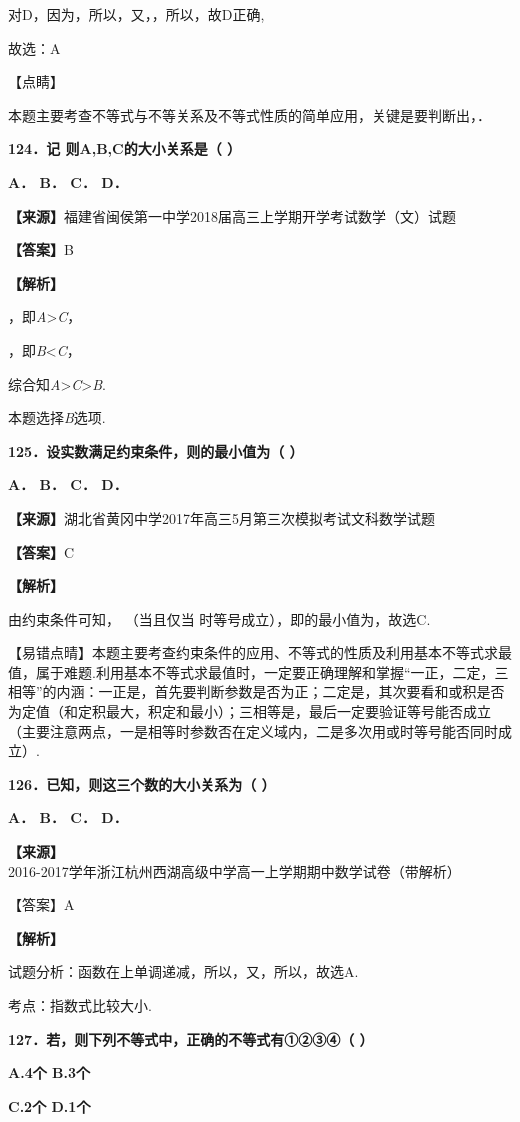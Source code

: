 对D，因为，所以，又，，所以，故D正确,

故选：A

【点睛】

本题主要考查不等式与不等关系及不等式性质的简单应用，关键是要判断出，．

\textbf{124．记 则A,B,C的大小关系是（ ）}

\textbf{A． B． C． D．}

\textbf{【来源】}福建省闽侯第一中学2018届高三上学期开学考试数学（文）试题

\textbf{【答案】}B

\textbf{【解析】}

，即\emph{A}\textgreater{}\emph{C}，

，即\emph{B}\textless{}\emph{C}，

综合知\emph{A}\textgreater{}\emph{C}\textgreater{}\emph{B}.

本题选择\emph{B}选项.

\textbf{125．设实数满足约束条件，则的最小值为（ ）}

\textbf{A． B． C． D．}

\textbf{【来源】}湖北省黄冈中学2017年高三5月第三次模拟考试文科数学试题

\textbf{【答案】}C

\textbf{【解析】}

由约束条件可知， （当且仅当 时等号成立），即的最小值为，故选C.

【易错点晴】本题主要考查约束条件的应用、不等式的性质及利用基本不等式求最值，属于难题.利用基本不等式求最值时，一定要正确理解和掌握``一正，二定，三相等''的内涵：一正是，首先要判断参数是否为正；二定是，其次要看和或积是否为定值（和定积最大，积定和最小）；三相等是，最后一定要验证等号能否成立（主要注意两点，一是相等时参数否在定义域内，二是多次用或时等号能否同时成立）.

\textbf{126．已知，则这三个数的大小关系为（ ）}

\textbf{A． B． C． D．}

\textbf{【来源】}2016-2017学年浙江杭州西湖高级中学高一上学期期中数学试卷（带解析）

【答案】A

\textbf{【解析】}

试题分析：函数在上单调递减，所以，又，所以，故选A.

考点：指数式比较大小.

\textbf{127．若，则下列不等式中，正确的不等式有①②③④（ ）}

\textbf{A.4个 B.3个}

\textbf{C.2个 D.1个}

